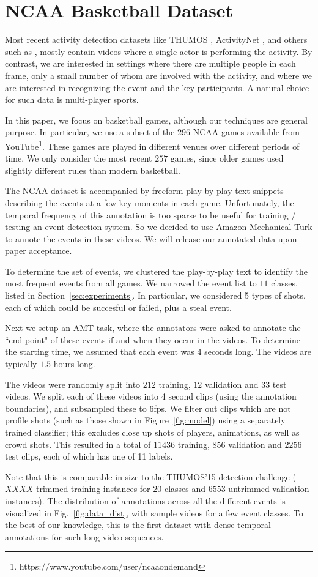 
\section{NCAA Basketball Dataset}

Most recent activity detection datasets like THUMOS \cite{THUMOS},
ActivityNet \cite{ActivityNet}, and others such as
\cite{UCF101,Finegrained_cooking}, mostly contain videos where a single actor is performing the activity.
By contrast, we are interested in settings where there are multiple
people in each frame, only a small number of whom are involved with
the  activity, and where we are interested in recognizing the event
and the key participants.
A natural choice for such data is multi-player sports.

In this paper, we focus on basketball games, although our techniques
are general purpose.
In particular,  we use a subset of the $296$ NCAA games available from 
YouTube\footnote{https://www.youtube.com/user/ncaaondemand}.  These games are
played in different venues over different periods of time.
We only consider the most recent $257$ games, since older games used
slightly different rules than modern basketball.

The NCAA dataset is accompanied by freeform play-by-play text snippets describing the events
at a few key-moments in each game.
Unfortunately, the temporal frequency of this annotation is too sparse
to be useful for training / testing an event detection system.
So we decided to use Amazon Mechanical Turk to annote the events in
these videos. We will release our annotated data upon paper
acceptance.

To determine the set of events, 
we clustered the
play-by-play text to identify the most frequent events from all games. We
narrowed the event list to $11$ classes,
listed in Section~\ref{sec:experiments}.
In particular, we considered 
5 types of shots, each of which could be succesful or failed,
plus a steal event. 

Next we setup an AMT task, where the
annotators were asked to annotate the ``end-point" of these events if and when
they occur in the videos. 
To determine the starting time, we assumed that each event was 4
seconds long. 
The videos are typically $1.5$ hours long.

The videos were randomly split into $212$ training, $12$ validation and $33$
test videos. 
We split each of these videos into 4 second clips (using the
annotation boundaries), and subsampled these to 6fps.
We filter out clips which are not profile shots (such as those shown in
Figure~\ref{fig:model}) using a separately trained classifier; this excludes close up shots of players, animations, as
well as crowd shots.
This resulted in a total of $11436$ training, $856$ validation
and $2256$ test clips, each of which has one of 11 labels.

Note that this is comparable in size to the THUMOS'15 detection
challenge ($XXXX$ trimmed training instances for $20$ classes and $6553$
untrimmed validation instances). The distribution of annotations across all the
different events is visualized in Fig.~\ref{fig:data_dist}, with sample videos
for a few event classes. To the best of our
knowledge, this is the first dataset with dense temporal annotations for
such long video sequences.
